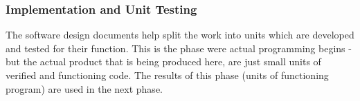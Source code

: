 \subsubsection{Implementation and Unit Testing}


The software design documents help split the work into units which are developed and tested for their function. This is the phase were actual programming begins - but the actual product that is being produced here, are just small units of verified and functioning code\cite{waterfallexplained}. The results of this phase (units of functioning program) are used in the next phase\cite{waterfallexplained}.
